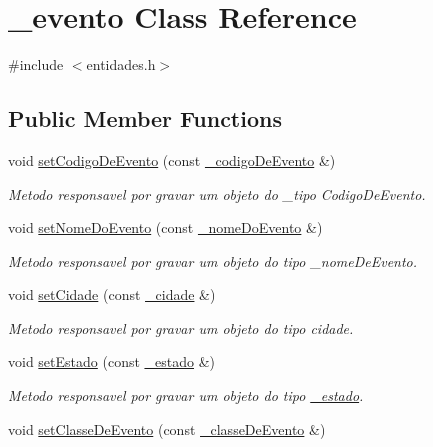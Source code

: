 \hypertarget{class__evento}{}\section{\+\_\+evento Class Reference}
\label{class__evento}


{\ttfamily \#include $<$entidades.\+h$>$}

\subsection*{Public Member Functions}
\begin{DoxyCompactItemize}
\item 
void \mbox{\hyperlink{class__evento_ad8f5f526282a8604ed5301ba40a766be}{set\+Codigo\+De\+Evento}} (const \mbox{\hyperlink{class__codigo_de_evento}{\+\_\+codigo\+De\+Evento}} \&)
\begin{DoxyCompactList}\small\item\em Metodo responsavel por gravar um objeto do \+\_\+tipo Codigo\+De\+Evento. \end{DoxyCompactList}\item 
void \mbox{\hyperlink{class__evento_a400868de18046d2191ac43de35be2488}{set\+Nome\+Do\+Evento}} (const \mbox{\hyperlink{class__nome_do_evento}{\+\_\+nome\+Do\+Evento}} \&)
\begin{DoxyCompactList}\small\item\em Metodo responsavel por gravar um objeto do tipo \+\_\+nome\+De\+Evento. \end{DoxyCompactList}\item 
void \mbox{\hyperlink{class__evento_a9f84949e7ac520ff72d0c01d0f90a86d}{set\+Cidade}} (const \mbox{\hyperlink{class__cidade}{\+\_\+cidade}} \&)
\begin{DoxyCompactList}\small\item\em Metodo responsavel por gravar um objeto do tipo cidade. \end{DoxyCompactList}\item 
void \mbox{\hyperlink{class__evento_a1dad563c93fdd542ba068a09b667ed4f}{set\+Estado}} (const \mbox{\hyperlink{class__estado}{\+\_\+estado}} \&)
\begin{DoxyCompactList}\small\item\em Metodo responsavel por gravar um objeto do tipo \mbox{\hyperlink{class__estado}{\+\_\+estado}}. \end{DoxyCompactList}\item 
void \mbox{\hyperlink{class__evento_a4c402e6c3c7b8cad8e693f080b8f399c}{set\+Classe\+De\+Evento}} (const \mbox{\hyperlink{class__classe_de_evento}{\+\_\+classe\+De\+Evento}} \&)

\end{DoxyCompactItemize}
